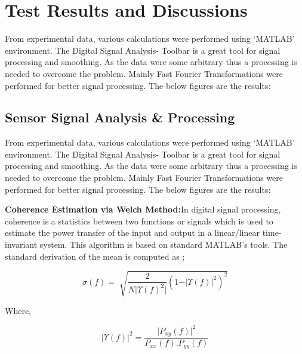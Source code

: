 \chapter{Test Results and Discussions}
From experimental data, various calculations were performed using ‘MATLAB’ environment. The Digital Signal Analysis- Toolbar is a great tool for signal processing and smoothing. As the data were some arbitrary thus a processing is needed to overcome the problem. Mainly Fast Fourier Transformations were performed for better signal processing. The below figures are the results:
\section{Sensor Signal Analysis \& Processing}
From experimental data, various calculations were performed using ‘MATLAB’ environment. The Digital Signal Analysis- Toolbar is a great tool for signal processing and smoothing. As the data were some arbitrary thus a processing is needed to overcome the problem. Mainly Fast Fourier Transformations were performed for better signal processing. The below figures are the results:

\setlength{\parskip}{0.0pt}
\textbf{Coherence Estimation via Welch Method:}In digital signal processing, coherence is a statistics between two functions or
signals which is used to estimate the power transfer of the input and output in a linear/linear time-invariant system. This algorithm is based on standard MATLAB’s tools. The standard derivation of the mean is computed as \cite{sethi2017internet,tsang2017iot,zawawi2018electromyography,gres2019orthogonal,regalia2018adaptive,de2013inverse,cohen2018automated,van2018signal,anchal2018nonlinearity,seichter2018online,lewicki2009eddy,hijazi2018ambient};\par

\begin{equation}\tag{6.1}
 \sigma  ( f ) = \sqrt[]{\frac{2}{N \vert  \Upsilon  ( f ) ^{2} \vert } ( 1- \vert  \Upsilon  ( f )  \vert ^{2} ) ^{2}}
\end{equation}
\begin{justify}
Where,
\end{justify}


\begin{equation}\tag{6.2}
 \vert  \Upsilon  ( f )  \vert ^{2}= \frac{ \vert P_{xy} ( f )  \vert ^{2}}{P_{xx} ( f ) .P_{yy} ( f ) }
\end{equation}

